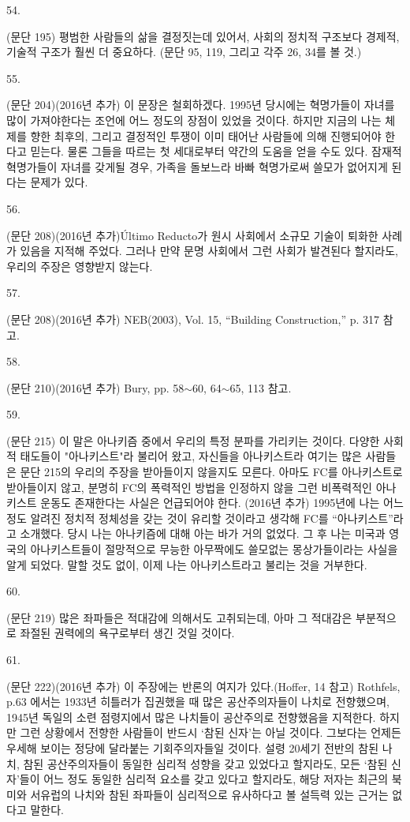 \documentclass[11pt,a4paper]{article}
\begin{document}
\begin{multicols}{2}
\hypertarget{54}{54.} (문단 195) 평범한 사람들의 삶을 결정짓는데 있어서, 사회의 정치적 구조보다 경제적, 기술적  구조가 훨씬 더 중요하다. (문단 95, 119, 그리고 각주 26, 34를 볼 것.) 


\hypertarget{55}{55.} (문단 204)(2016년 추가) 이 문장은 철회하겠다. 1995년 당시에는 혁명가들이 자녀를 많이 가져야한다는 조언에 어느 정도의 장점이 있었을 것이다. 하지만 지금의 나는 체제를 향한 최후의, 그리고 결정적인 투쟁이 이미 태어난 사람들에 의해 진행되어야 한다고 믿는다. 물론 그들을 따르는 첫 세대로부터 약간의 도움을 얻을 수도 있다. 잠재적 혁명가들이 자녀를 갖게될 경우, 가족을 돌보느라 바빠 혁명가로써 쓸모가 없어지게 된다는 문제가 있다. 


\hypertarget{56}{56.} (문단 208)(2016년 추가)Último Reducto가 원시 사회에서 소규모 기술이 퇴화한 사례가 있음을  지적해 주었다. 그러나 만약 문명 사회에서 그런 사회가 발견된다 할지라도, 우리의 주장은 영향받지  않는다. 


\hypertarget{57}{57.} (문단 208)(2016년 추가) NEB(2003), Vol. 15, “Building Construction,” p. 317 참고.


\hypertarget{58}{58.} (문단 210)(2016년 추가) Bury, pp. 58${\sim}$60, 64${\sim}$65, 113 참고. 


\hypertarget{59}{59.} (문단 215) 이 말은 아나키즘 중에서 우리의 특정 분파를 가리키는 것이다. 다양한 사회적 태도들이 "아나키스트"라 불리어 왔고, 자신들을 아나키스트라 여기는 많은 사람들은 문단 215의 우리의 주장을  받아들이지 않을지도 모른다. 아마도 FC를 아나키스트로 받아들이지 않고, 분명히 FC의 폭력적인 방법을 인정하지 않을 그런 비폭력적인 아나키스트 운동도 존재한다는 사실은 언급되어야 한다. 
(2016년 추가) 1995년에 나는 어느 정도 알려진 정치적 정체성을 갖는 것이 유리할 것이라고 생각해  FC를 “아나키스트”라고 소개했다. 당시 나는 아나키즘에 대해 아는 바가 거의 없었다. 그 후 나는 미국과  영국의 아나키스트들이 절망적으로 무능한 아무짝에도 쓸모없는 몽상가들이라는 사실을 알게 되었다.  말할 것도 없이, 이제 나는 아나키스트라고 불리는 것을 거부한다. 


\hypertarget{60}{60.} (문단 219) 많은 좌파들은 적대감에 의해서도 고취되는데, 아마 그 적대감은 부분적으로 좌절된 권력에의 욕구로부터 생긴 것일 것이다. 


\hypertarget{61}{61.} (문단 222)(2016년 추가) 이 주장에는 반론의 여지가 있다.(Hoffer, 14 참고) Rothfels, p.63 에서는 1933년 히틀러가 집권했을 때 많은 공산주의자들이 나치로 전향했으며, 1945년 독일의 소련 점령지에서 많은 나치들이 공산주의로 전향했음을 지적한다. 하지만 그런 상황에서 전향한 사람들이  반드시 ‘참된 신자’는 아닐 것이다. 그보다는 언제든 우세해 보이는 정당에 달라붙는 기회주의자들일  것이다. 설령 20세기 전반의 참된 나치, 참된 공산주의자들이 동일한 심리적 성향을 갖고 있었다고  할지라도, 모든 ‘참된 신자’들이 어느 정도 동일한 심리적 요소를 갖고 있다고 할지라도, 해당 저자는  최근의 북미와 서유럽의 나치와 참된 좌파들이 심리적으로 유사하다고 볼 설득력 있는 근거는 없다고  말한다. 



\end{multicols}
\end{document}
